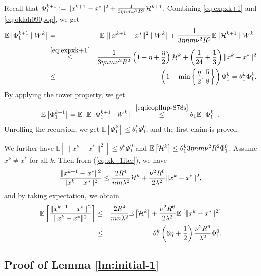\documentclass[12pt]{article}
\newcommand{\eqdef}{\; { := }\;}
\newcommand{\ExpBr}[1]{\mathbb{E}\left[#1\right]}
\begin{document}
Recall that $\Phi_1^{k+1} \eqdef \|x^{k+1} - x^*\|^2 + \frac{1}{3\eta nm  \nu^2 R^2} {\cal H}^{k+1}$. Combining \eqref{eq:expxk+1} and \eqref{eq:oklah090pop}, we get
\begin{eqnarray}
	\ExpBr{ \Phi_1^{k+1} \;|\; W^k} &=& \ExpBr{ \|x^{k+1} - x^*\|^2 \;|\; W^k} + \frac{1}{3\eta nm  \nu^2 R^2}  \ExpBr{ {\cal H}^{k+1} \;|\; W^k}  \notag\\ 
	&\overset{\eqref{eq:expxk+1}}\leq&  \frac{1}{3\eta nm  \nu^2 R^2} \left(  1 - \eta + \frac{\eta}{2}  \right) {\cal H}^k  + \left(  \frac{1}{24} + \frac{1}{3}  \right)  \|x^k - x^*\|^2  \notag \\ 
	&\leq& \left(  1 - \min \left\{  \frac{\eta}{2}, \frac{5}{8}  \right\}  \right)  \Phi_1^k = \theta_1^k \Phi_1^k. \label{eq:ieopllup-878s}
\end{eqnarray}
By applying the tower property, we get $$\ExpBr{\Phi_1^{k+1}} = \ExpBr{\ExpBr{ \Phi_1^{k+1} \;|\; W^k}} \overset{\eqref{eq:ieopllup-878s}}{\leq} \theta_1 \ExpBr{\Phi_1^k}.$$ Unrolling the recursion, we get   $\ExpBr{\Phi_1^k } \leq  
\theta_1^k  \Phi_1^0$, and the first claim is proved.

We further have $\ExpBr{ \|x^k - x^*\|^2 } \leq \theta_1^k \Phi_1^0$ and $\ExpBr{{\cal H}^k} \leq  \theta_1^k 3\eta nm \nu^2 R^2 \Phi_1^0$. Assume $x^k \neq x^*$ for all $k$. Then from (\ref{eq:xk+1iter}), we have 
$$
\frac{\|x^{k+1} - x^*\|^2}{\|x^k - x^*\|^2 } \leq \frac{2R^4}{nm \lambda^2} {\cal H}^k + \frac{\nu^2 R^6}{2\lambda^2}\|x^k - x^*\|^2, 
$$
and by taking expectation, we obtain 
\begin{eqnarray*}
	\ExpBr{  \frac{\|x^{k+1} - x^*\|^2}{\|x^k - x^*\|^2 }  } &\leq& \frac{2R^4}{mn \lambda^2} \ExpBr{{\cal H}^k } + \frac{\nu^2 R^6}{2\lambda^2} \ExpBr{ \|x^k - x^*\|^2 } \\ 
	&\leq&\theta_1^k  \left(  {6\eta} + \frac{1}{2}  \right) \frac{\nu^2 R^6}{\lambda^2} \Phi_1^0. 
\end{eqnarray*}



\subsection{Proof of Lemma \ref{lm:initial-1}}
\end{document}
